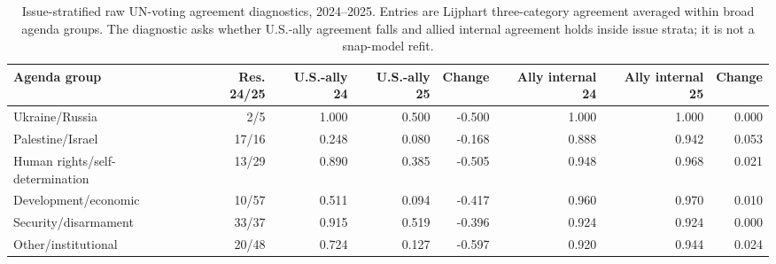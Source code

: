\begin{table}[!htbp]
\centering
\begingroup
\scriptsize
\caption{Issue-stratified raw UN-voting agreement diagnostics, 2024--2025. Entries are Lijphart three-category agreement averaged within broad agenda groups. The diagnostic asks whether U.S.-ally agreement falls and allied internal agreement holds inside issue strata; it is not a snap-model refit.}
\label{tab:un-issue-agreement}
\begin{tabularx}{\textwidth}{@{}>{\raggedright\arraybackslash}Xrrrrrrr@{}}
\toprule
Agenda group & Res. 24/25 & U.S.-ally 24 & U.S.-ally 25 & Change & Ally internal 24 & Ally internal 25 & Change \\
\midrule
Ukraine/Russia & 2/5 & 1.000 & 0.500 & -0.500 & 1.000 & 1.000 & 0.000 \\
Palestine/Israel & 17/16 & 0.248 & 0.080 & -0.168 & 0.888 & 0.942 & 0.053 \\
Human rights/self-determination & 13/29 & 0.890 & 0.385 & -0.505 & 0.948 & 0.968 & 0.021 \\
Development/economic & 10/57 & 0.511 & 0.094 & -0.417 & 0.960 & 0.970 & 0.010 \\
Security/disarmament & 33/37 & 0.915 & 0.519 & -0.396 & 0.924 & 0.924 & 0.000 \\
Other/institutional & 20/48 & 0.724 & 0.127 & -0.597 & 0.920 & 0.944 & 0.024 \\
\bottomrule
\end{tabularx}
\endgroup
\end{table}
